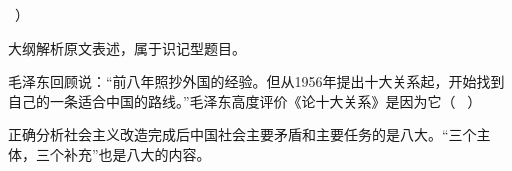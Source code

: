 ~）
\par\fourch{\textcolor{red}{“统筹兼顾，适当安排”}}{\textcolor{red}{“团结——批评——团结”}}{\textcolor{red}{“百花齐放，百家争鸣”}}{\textcolor{red}{“长期共存、互相监督”}}
\begin{solution}大纲解析原文表述，属于识记型题目。
\end{solution}
\question 毛泽东回顾说：``前八年照抄外国的经验。但从1956年提出十大关系起，开始找到自己的一条适合中国的路线。''毛泽东高度评价《论十大关系》是因为它（
~）
\par{}
\begin{solution}正确分析社会主义改造完成后中国社会主要矛盾和主要任务的是八大。``三个主体，三个补充''也是八大的内容。
\end{solution}
